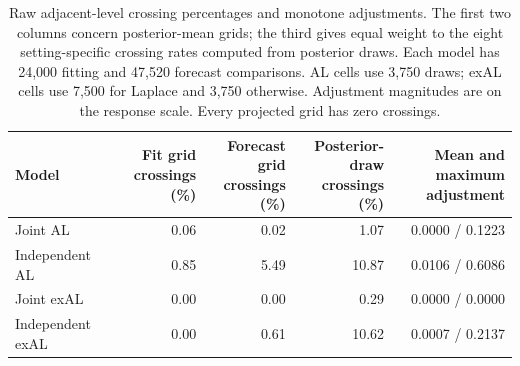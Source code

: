 \begin{table}[!htbp]
\centering
\footnotesize
\setlength{\tabcolsep}{3pt}
\renewcommand{\arraystretch}{1.08}
\begin{tabular}{@{}lrrrr@{}}
\toprule
Model & \shortstack{Fit grid\\crossings (\%)} & \shortstack{Forecast grid\\crossings (\%)} & \shortstack{Posterior-draw\\crossings (\%)} & \shortstack{Mean and maximum\\adjustment} \\
\midrule
Joint AL & 0.06 & 0.02 & 1.07 & 0.0000 / 0.1223 \\
Independent AL & 0.85 & 5.49 & 10.87 & 0.0106 / 0.6086 \\
Joint exAL & 0.00 & 0.00 & 0.29 & 0.0000 / 0.0000 \\
Independent exAL & 0.00 & 0.61 & 10.62 & 0.0007 / 0.2137 \\
\bottomrule
\end{tabular}
\caption{Raw adjacent-level crossing percentages and monotone adjustments. The first two columns concern posterior-mean grids; the third gives equal weight to the eight setting-specific crossing rates computed from posterior draws. Each model has 24,000 fitting and 47,520 forecast comparisons. AL cells use 3,750 draws; exAL cells use 7,500 for Laplace and 3,750 otherwise. Adjustment magnitudes are on the response scale. Every projected grid has zero crossings.}
\label{tab:joint-qdesn-pure-desn-v2-crossings}
\end{table}
